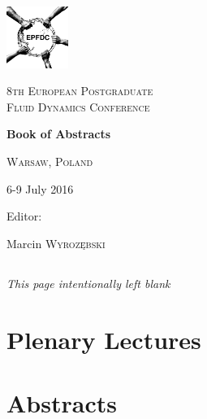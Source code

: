 \documentclass[11pt,a4paper]{report}
\numberwithin{equation}{section}
\begin{document}
\pagestyle{plain}


\newpage 

\begin{titlepage}
	\centering
	\includegraphics[width=0.15\textwidth]{../logo.png}\par\vspace{1cm}
	{\scshape\LARGE 8th European Postgraduate\\Fluid Dynamics Conference \par}	
	
	
	\vspace{1.5cm}
	{\Huge\bfseries Book of Abstracts\par}
	\vspace{2cm}

	\vspace{1cm}
	{\scshape\Large Warsaw, Poland\par}
	{\Large 6-9 July 2016\par}
	\vfill
	Editor:\par
	Marcin \textsc{Wyrozębski}


\end{titlepage}

\newpage 


\newpage 


\vspace{2cm}


\newpage


\newpage

\tableofcontents
\newpage 

%
\section*{}
\vfill
\begin{center}
	\textit{This page intentionally left blank}
\end{center}
\newpage
\chapter{Plenary Lectures}
\newpage






\chapter{Abstracts}
\newpage

\end{document}
